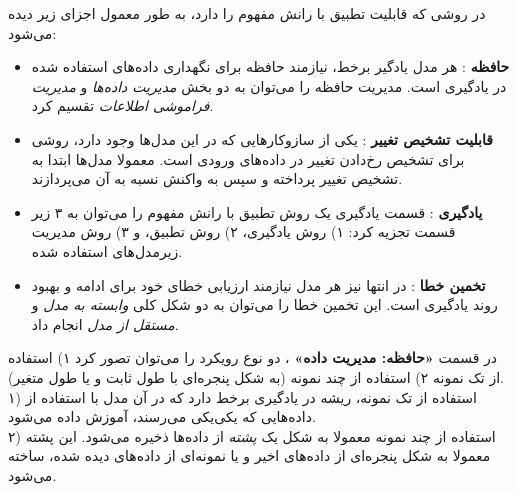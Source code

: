 
در روشی که قابلیت تطبیق با رانش مفهوم را دارد، به طور معمول اجزای زیر دیده می‌شود:
\begin{itemize}
\item \textbf{
حافظه
}:
هر مدل یادگیر برخط، نیازمند حافظه برای نگهداری داده‌های استفاده شده در یادگیری است. مدیریت حافظه را می‌توان به دو بخش 
\textit{
مدیریت داده‌ها
} 
و 
\textit{
مدیریت فراموشی اطلاعات
} 
تقسیم کرد.

\item \textbf{
قابلیت تشخیص تغییر
}: 
یکی از سازوکارهایی که در این مدل‌ها وجود دارد، روشی برای تشخیص رخ‌دادن تغییر در داده‌های ورودی است. معمولا مدل‌ها ابتدا به تشخیص تغییر پرداخته و سپس به واکنش نسبه به آن می‌پردازند.


\item \textbf{
یادگیری
}: 
قسمت یادگیری یک روش تطبیق با رانش مفهوم را می‌توان به ۳ زیر قسمت تجزیه کرد: ۱) روش یادگیری، ۲) روش تطبیق، و ۳) روش مدیریت زیرمدل‌های استفاده شده.



\item \textbf{
تخمین خطا
}:
در انتها نیز هر مدل نیازمند ارزیابی خطای خود برای ادامه و بهبود روند یادگیری است. این تخمین خطا را می‌توان به دو شکل کلی 
\textit{
وابسته به مدل
} 
و 
\textit{
مستقل از مدل
} 
انجام داد.

\end{itemize}




در قسمت 
\textbf{
«حافظه: مدیریت داده»
}، 
دو نوع رویکرد را می‌توان تصور کرد ۱) استفاده از تک نمونه ۲) استفاده از چند نمونه (به شکل پنجره‌ای با طول ثابت و یا طول متغیر).\\
۱) استفاده از تک نمونه، ریشه در یادگیری برخط دارد که در آن مدل با استفاده از داده‌هایی که یکی‌یکی می‌رسند، آموزش داده می‌شود.\\
۲) استفاده از چند نمونه معمولا به شکل یک 
\textit{
پشته
} 
از داده‌ها ذخیره می‌شود. این پشته معمولا به شکل پنجره‌ای از داده‌های اخیر و یا نمونه‌ای از داده‌های دیده شده، ساخته می‌شود.


